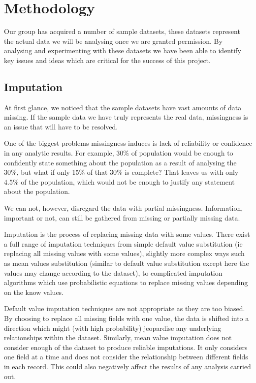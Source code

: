 \documentclass[bsc]{abdnthesis}
\begin{document}

\chapter{Methodology}
Our group has acquired a number of sample datasets, these datasets represent the actual data we will be analysing once we are granted permission. By analysing and experimenting with these datasets we have been able to identify key issues and ideas which are critical for the success of this project.
\section{Imputation} %
\label{sec:imputation}
At first glance, we noticed that the sample datasets have vast amounts of data missing. If the sample data we have truly represents the real data, missingness is an issue that will have to be resolved. 

One of the biggest problems missingness induces is lack of reliability or confidence in any analytic results. For example, 30\% of population would be enough to confidently state something about the population as a result of analysing the 30\%, but what if only 15\% of that 30\% is complete? That leaves us with only 4.5\% of the population, which would not be enough to justify any statement about the population. 

We can not, however, disregard the data with partial missingness. Information, important or not, can still be gathered from missing or partially missing data. 

Imputation is the process of replacing missing data with some values\cite{ imp}. There exist a full range of imputation techniques from simple default value substitution (ie replacing all missing values with some values)\cite{ imp-default}, slightly more complex ways such as mean values substitution \cite{ imp-mean}(similar to default value substitution except here the values may change according to the dataset), to complicated imputation algorithms which use probabilistic equations to replace missing values depending on the know values\cite{ imp-mice, imp-mi}. 

Default value imputation techniques are not appropriate as they are too biased. By choosing to replace all missing fields with one value, the data is shifted into a direction which might (with high probability) jeopardise any underlying relationships within the dataset. Similarly, mean value imputation does not consider enough of the dataset to produce reliable imputations. It only considers one field at a time and does not consider the relationship between different fields in each record. This could also negatively affect the results of any analysis carried out. 
\end{document}

